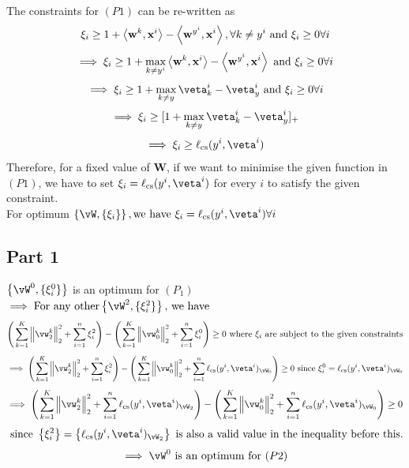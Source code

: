 \documentclass[a4paper,11pt]{article}
\begin{document}
\begin{mlsolution}
The constraints for $(P1)$ can be re-written as 
\[ \xi_i  \geq 1 + \left\langle{\mathbf{w}^{k}},{\mathbf{x}^i}\right\rangle - \left\langle{\mathbf{w}^{y^i}},{\mathbf{x}^i}\right\rangle, \forall k \neq y^i \text{ and } \xi_i \geq 0 \forall i \]
\[\implies \xi_i  \geq 1 + \max_{k \neq y^i} \left\langle{\mathbf{w}^{k}},{\mathbf{x}^i}\right\rangle - \left\langle{\mathbf{w}^{y^i}},{\mathbf{x}^i}\right\rangle \text{ and } \xi_i \geq 0 \forall i\]
\[\implies \xi_i  \geq 1 + \max_{k \neq y}\veta^i_k - \veta^i_y \text{ and } \xi_i \geq 0 \forall i \]
\[\implies \xi_i \geq [1 + \max_{k \neq y}\veta^i_k - \veta^i_y]_+ \]
\[\implies \xi_i \geq \ell_\text{cs}(y^i,\veta^i) \]
Therefore, for a fixed value of $\mathbf{W}$, if we want to minimise the given function in $(P1)$, we have to set $\xi_i = \ell_\text{cs}(y^i,\veta^i)$ for every $i$ to satisfy the given constraint.
\\For optimum $\bc{\vW, \{\xi_i\}},\text{we have } \xi_i = \ell_\text{cs}(y^i,\veta^i) \forall i$\newline

\subsection*{Part 1}
$\bc{\vW^0, \{\xi^0_i\}}$ is an optimum for $(P_1)$
\\ $\implies \text{For any other} \bc{\vW^2, \{\xi^2_i\}} \text{, we have }$ 
\[ \Bigg(\sum_{k=1}^K\norm{\vw^k_2}_2^2 + \sum_{i=1}^n\xi^2_i\Bigg) - \Bigg(\sum_{k=1}^K\norm{\vw^k_0}_2^2 + \sum_{i=1}^n\xi^0_i\Bigg) \geq 0 \text{ where $\xi_i$ are subject to the given constraints} \]
\[ \implies \Bigg(\sum_{k=1}^K\norm{\vw^k_2}_2^2 + \sum_{i=1}^n\xi^2_i\Bigg) - \Bigg(\sum_{k=1}^K\norm{\vw^k_0}_2^2 + \sum_{i=1}^n\ell_\text{cs}(y^i,\veta^i)_{\vW_0}  \Bigg) \geq 0 \text{ since } \xi_i^0 = \ell_\text{cs}(y^i,\veta^i)_{\vW_0}\]
\[ \implies \Bigg(\sum_{k=1}^K\norm{\vw^k_2}_2^2 + \sum_{i=1}^n\ell_\text{cs}(y^i,\veta^i)_{\vW_2} \Bigg) - \Bigg(\sum_{k=1}^K\norm{\vw^k_0}_2^2 + \sum_{i=1}^n\ell_\text{cs}(y^i,\veta^i)_{\vW_0} \Bigg) \geq 0\]
\[ \text{ since } \bc{\xi^2_i} = \bc{\ell_\text{cs}(y^i,\veta^i)_{\vW_2}} \text{ is also a valid value in the inequality before this.} \]
\[\implies \vW^0 \text{ is an optimum for } (P2)\]
\newpage

\end{mlsolution}
\end{document}
